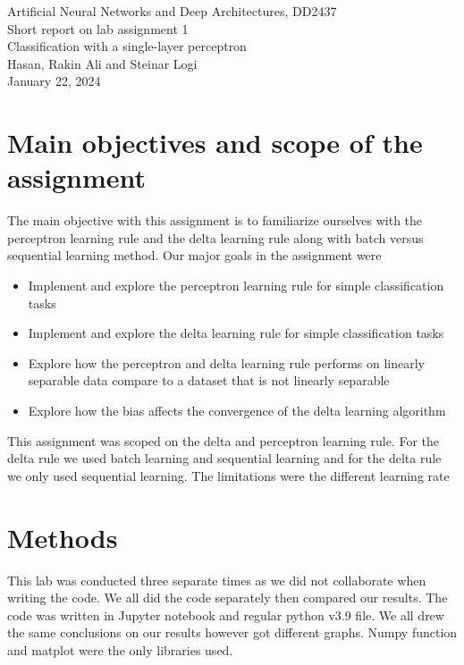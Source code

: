\documentclass[a4paper]{article}
\begin{document}
\begin{center}
  {\large Artificial Neural Networks and Deep Architectures, DD2437}\\
  \vspace{7mm}
  {\huge Short report on lab assignment 1\\[1ex]}
  {\Large Classification with a single-layer perceptron}\\
  \vspace{8mm}  
  {\Large Hasan, Rakin Ali and Steinar Logi \\}
  \vspace{4mm}
  {\large January 22, 2024 \\}
\end{center}

\section{Main objectives and scope of the assignment \normalsize}
The main objective with this assignment is to familiarize ourselves with the perceptron learning rule and the delta learning rule along with batch versus sequential learning method. 
Our major goals in the assignment were  
\begin{itemize}
\item Implement and explore the perceptron learning rule for simple classification tasks
\item Implement and explore the delta learning rule for simple classification tasks 
\item Explore how the perceptron and delta learning rule performs on linearly separable data compare to a dataset that is not linearly separable
\item Explore how the bias affects the convergence of the delta learning algorithm
\end{itemize}

This assignment was scoped on the delta and perceptron learning rule. For the delta rule we used batch learning and sequential learning and for the delta rule we only used sequential learning. The limitations were the different learning rate

\section{Methods} This lab was conducted three separate times as we did not collaborate when writing the code. We all did the code separately then compared our results. The code was written in Jupyter notebook and regular python v3.9 file. We all drew the same conclusions on our results however got different graphs. Numpy function and matplot were the only libraries used.  \\
\end{document}
